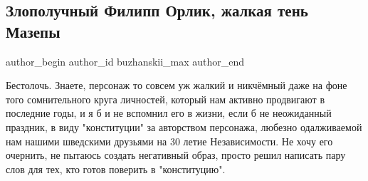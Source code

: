  
 
 
 
 
 
\subsection{Злополучный Филипп Орлик, жалкая тень Мазепы}
\label{sec:22_05_2021.fb.buzhanskii_max.1.orlik_filip_mazepa}
\ifcmt
 author_begin
   author_id buzhanskii_max
 author_end
\fi

\obeycr
	Бестолочь.
Знаете, персонаж то совсем уж жалкий и никчёмный даже на фоне того сомнительного круга личностей, который нам активно продвигают в последние годы, и я б и не вспомнил его в жизни, если б не неожиданный праздник, в виду "конституции" за авторством персонажа, любезно одалживаемой нам нашими шведскими друзьями на 30 летие Независимости.
Не хочу его очернить, не пытаюсь создать негативный образ, просто решил написать пару слов для тех, кто готов поверить в "конституцию".

